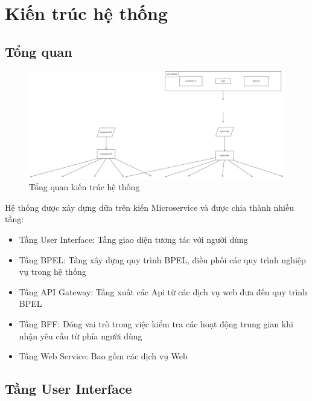 
\section{Kiến trúc hệ thống}
\subsection{Tổng quan}
\begin{figure}[!htp]
	\centering
	\includegraphics[width=6in]{img/Architecture/general-architect.png}
	\newline
	\caption{Tổng quan kiến trúc hệ thống}
\end{figure}

Hệ thống được xây dựng dữa trên kiến Microservice và được chia thành nhiều tầng:
\begin{itemize}
	\item Tầng User Interface: Tầng giao diện tương tác với người dùng
	\item Tầng BPEL: Tầng xây dựng quy trình BPEL, điều phối các quy trình nghiệp vụ trong hệ thống
	\item Tầng API Gateway: Tầng xuất các Api từ các dịch vụ web đưa đến quy trình BPEL
	\item Tầng BFF: Đóng vai trò trong việc kiểm tra các hoạt động trung gian khi nhận yêu cầu từ phía người dùng
	\item Tầng Web Service: Bao gồm các dịch vụ Web 
\end{itemize}


\subsection{Tầng User Interface}


